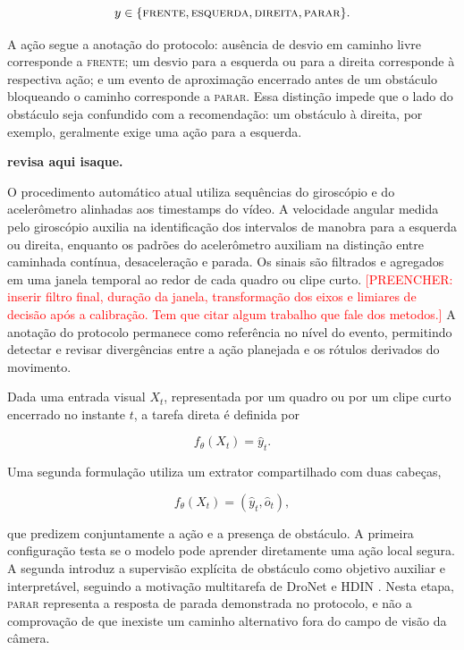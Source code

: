 \documentclass[conference]{IEEEtran}
\newcommand{\todo}[1]{\textcolor{red}{[PREENCHER: #1]}}
\begin{document}
\begin{equation}
    y \in \{\textsc{frente},\textsc{esquerda},\textsc{direita},\textsc{parar}\}.
\end{equation}

A ação segue a anotação do protocolo: ausência de desvio em caminho livre corresponde a \textsc{frente}; um desvio para a esquerda ou para a direita corresponde à respectiva ação; e um evento de aproximação encerrado antes de um obstáculo bloqueando o caminho corresponde a \textsc{parar}. Essa distinção impede que o lado do obstáculo seja confundido com a recomendação: um obstáculo à direita, por exemplo, geralmente exige uma ação para a esquerda.

\textbf{revisa aqui isaque.}

O procedimento automático atual utiliza sequências do giroscópio e do acelerômetro alinhadas aos timestamps do vídeo. A velocidade angular medida pelo giroscópio auxilia na identificação dos intervalos de manobra para a esquerda ou direita, enquanto os padrões do acelerômetro auxiliam na distinção entre caminhada contínua, desaceleração e parada. Os sinais são filtrados e agregados em uma janela temporal ao redor de cada quadro ou clipe curto. \todo{inserir filtro final, duração da janela, transformação dos eixos e limiares de decisão após a calibração. Tem que citar algum trabalho que fale dos metodos.} A anotação do protocolo permanece como referência no nível do evento, permitindo detectar e revisar divergências entre a ação planejada e os rótulos derivados do movimento.

Dada uma entrada visual $X_t$, representada por um quadro ou por um clipe curto encerrado no instante $t$, a tarefa direta é definida por

\begin{equation}
    f_{\theta}(X_t)=\hat{y}_t.
\end{equation}

Uma segunda formulação utiliza um extrator compartilhado com duas cabeças,

\begin{equation}
    f_{\theta}(X_t)=\left(\hat{y}_t,\hat{o}_t\right),
\end{equation}

que predizem conjuntamente a ação e a presença de obstáculo. A primeira configuração testa se o modelo pode aprender diretamente uma ação local segura. A segunda introduz a supervisão explícita de obstáculo como objetivo auxiliar e interpretável, seguindo a motivação multitarefa de DroNet e HDIN \cite{loquercio2018,chang2022}. Nesta etapa, \textsc{parar} representa a resposta de parada demonstrada no protocolo, e não a comprovação de que inexiste um caminho alternativo fora do campo de visão da câmera.
\end{document}
